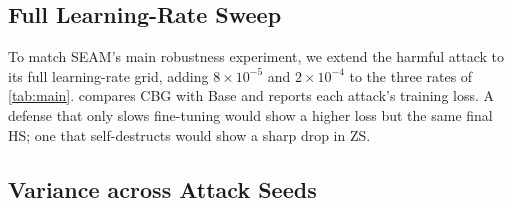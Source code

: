 \subsection{Full Learning-Rate Sweep}
\label{sec:exp_lr}

To match SEAM's main robustness experiment, we extend the harmful attack to its full learning-rate grid, adding $8\times10^{-5}$ and $2\times10^{-4}$ to the three rates of \cref{tab:main}.  compares CBG with Base and reports each attack's training loss. A defense that only slows fine-tuning would show a higher loss but the same final HS; one that self-destructs would show a sharp drop in ZS.

\begin{table}[t]
\centering
\caption{Harmful attack learning-rate sweep (1{,}000 samples, 250 steps, seed 42). HS and ZS in \%; Loss is the mean attack training loss.}
\label{tab:lr_sweep}
\end{table}

\subsection{Variance across Attack Seeds}
\label{sec:exp_variance}

